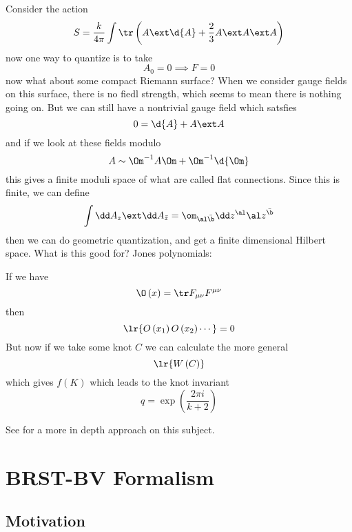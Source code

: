 \documentclass{booc}
\begin{document}
Consider the action
\begin{equation}
S = \frac{k}{4\pi} \int \tr\left( A\ext \d{A} + \frac{2}{3}
A\ext A\ext A\right)
\end{equation}
now one way to quantize is to take
\begin{equation}
A_0 = 0 \implies F = 0
\end{equation}
now what about some compact Riemann surface?
When we consider gauge fields on this surface, 
there is no fiedl strength, which seems to mean there is nothing going on. 
But we can still have a nontrivial gauge field which satsfies
\begin{equation}
0 = \d{A} + A\ext A
\end{equation}
and if we look at these fields modulo
\begin{equation}
A \sim \Om^{-1} A \Om + \Om^{-1} \d{\Om}
\end{equation}
this gives a finite moduli space of what are called flat connections. 
Since this is finite, we can define
\begin{equation}
\int \dd A_z \ext \dd A_{\bar z}
= \om_{\al\bar \b} \dd z^\al \al z^{\bar \b}
\end{equation}
then we can do geometric quantization, and get a finite dimensional Hilbert space. 
What is this good for?
Jones polynomials:

If we have
\begin{equation}
\O\left( x \right) = \tr F_{\mu\nu} F^{\mu\nu}
\end{equation}
then
\begin{equation}
\lr{O\left( x_1 \right)O\left( x_2 \right) \cdots} = 0
\end{equation}
But now if we take some knot $C$ we can calculate the more general 
\begin{equation}
\lr{W\left( C\right)}
\end{equation}
which gives $f\left( K \right)$ which leads to the knot invariant
\begin{equation}
q = \exp\left( \frac{2\pi i}{k + 2} \right)
\end{equation}

See \cite{witten_jones} for a more in depth approach on this subject.

\section{BRST-BV Formalism}

\subsection{Motivation}
\end{document}
